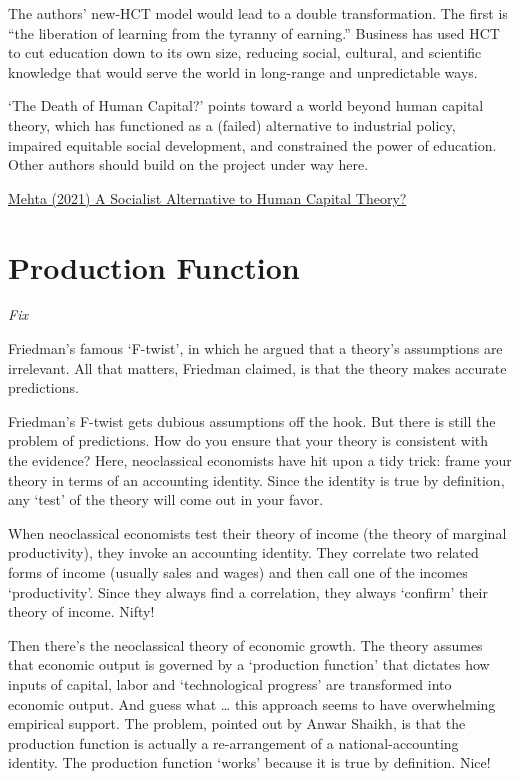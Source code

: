 \documentclass[
]{book}
\begin{document}
The authors' new-HCT model would lead to a double transformation. The first is ``the liberation of learning from the tyranny of earning.'' Business has used HCT to cut education down to its own size, reducing social, cultural, and scientific knowledge that would serve the world in long-range and unpredictable ways.

`The Death of Human Capital?' points toward a world beyond human capital theory, which has functioned as a (failed) alternative to industrial policy, impaired equitable social development, and constrained the power of education. Other authors should build on the project under way here.

\href{https://lareviewofbooks.org/article/a-socialist-alternative-to-human-capital-theory/}{Mehta (2021) A Socialist Alternative to Human Capital Theory?}

\hypertarget{production-function}{%
\section{Production Function}\label{production-function}}

\emph{Fix}

Friedman's famous `F-twist', in which he argued that a theory's assumptions are irrelevant. All that matters, Friedman claimed, is that the theory makes accurate predictions.

Friedman's F-twist gets dubious assumptions off the hook. But there is still the problem of predictions. How do you ensure that your theory is consistent with the evidence? Here, neoclassical economists have hit upon a tidy trick: frame your theory in terms of an accounting identity. Since the identity is true by definition, any `test' of the theory will come out in your favor.

When neoclassical economists test their theory of income (the theory of marginal productivity), they invoke an accounting identity. They correlate two related forms of income (usually sales and wages) and then call one of the incomes `productivity'. Since they always find a correlation, they always `confirm' their theory of income. Nifty!

Then there's the neoclassical theory of economic growth. The theory assumes that economic output is governed by a `production function' that dictates how inputs of capital, labor and `technological progress' are transformed into economic output. And guess what \ldots{} this approach seems to have overwhelming empirical support. The problem, pointed out by Anwar Shaikh, is that the production function is actually a re-arrangement of a national-accounting identity. The production function `works' because it is true by definition. Nice!
\end{document}
